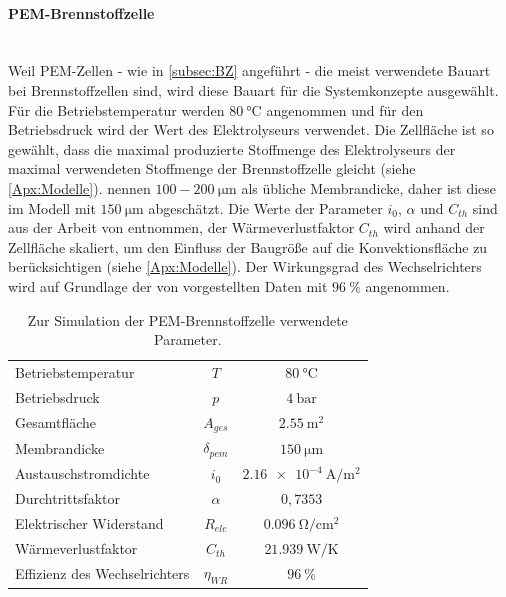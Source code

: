 \paragraph{PEM-Brennstoffzelle}\ \\
Weil PEM-Zellen - wie in \ref{subsec:BZ} angeführt - die meist verwendete Bauart bei Brennstoffzellen sind, wird diese Bauart für die Systemkonzepte ausgewählt. Für die Betriebstemperatur werden $\SI{80}{\degreeCelsius}$ angenommen und für den Betriebsdruck wird der Wert des Elektrolyseurs verwendet. Die Zellfläche ist so gewählt, dass die maximal produzierte Stoffmenge des Elektrolyseurs der maximal verwendeten Stoffmenge der Brennstoffzelle gleicht (siehe \ref{Apx:Modelle}). \citet{rashid_hydrogen_2015} nennen $100-\SI{200}{\micro\m}$ als übliche Membrandicke, daher ist diese im Modell mit $\SI{150}{\micro\m}$ abgeschätzt.
Die Werte der Parameter $i_0$, $\alpha$ und $C_{th}$ sind aus der Arbeit von \citet{webster_implementation_2019} entnommen, der Wärmeverlustfaktor $C_{th}$ wird anhand der Zellfläche skaliert, um den Einfluss der Baugröße auf die Konvektionsfläche zu berücksichtigen (siehe \ref{Apx:Modelle}). 
Der Wirkungsgrad des Wechselrichters wird auf Grundlage der von \citet{trubitsyn_high-efficiency_2010} vorgestellten Daten mit $\SI{96}{\%}$ angenommen.

\begin{table}[ht]
		\centering
		\caption{Zur Simulation der PEM-Brennstoffzelle verwendete Parameter.}
		\begin{tabular}{l c c}
		\toprule
		Betriebstemperatur & $T$ & $\SI{80}{\degreeCelsius}$\\
		Betriebsdruck & $p$ & $\SI{4}{\bar}$\\
		Gesamtfläche & $A_{ges}$ & $\SI{2,55}{\m\squared }$\\
		Membrandicke & $\delta_{pem}$ & $\SI{150}{\micro\m}$\\
		Austauschstromdichte & $i_0$ & $ \SI{2,16e-4}{\A\per\m\squared}$\\
		Durchtrittsfaktor & $\alpha$ & $0,7353$\\
		Elektrischer Widerstand & $R_{ele}$ & $\SI{0,096}{\ohm\per\cm\squared}$ \citep{tjarks_pem-elektrolyse-systeme_2017}\\	
		Wärmeverlustfaktor & $C_{th}$ & $\SI{21,939}{\W\per\K}$\\
		Effizienz des Wechselrichters & $\eta_{WR}$ & $\SI{96}{\%}$ \\
		\bottomrule
		\end{tabular}
		\label{tb:ParameterBrennstoffzelle}
\end{table}	

